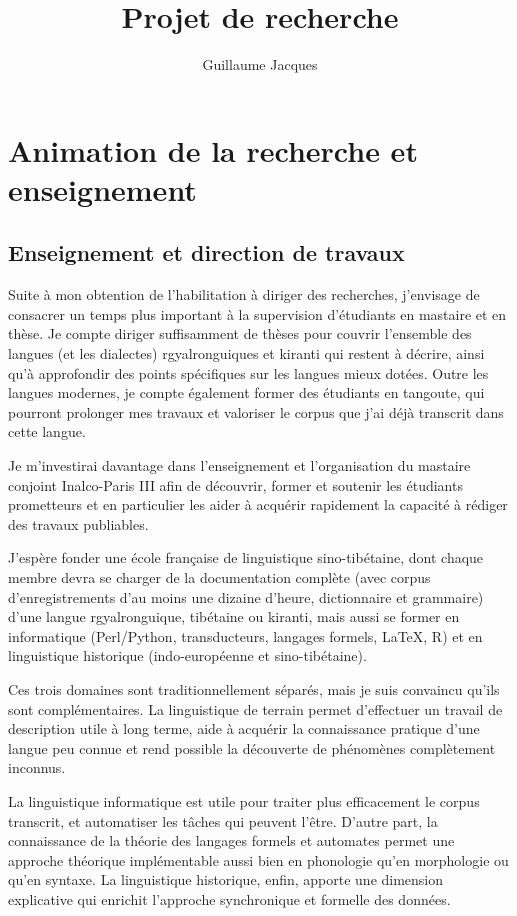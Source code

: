 \documentclass[oldfontcommands,oneside,a4paper,11pt]{article}
\begin{document}
\title{Projet de recherche} 
\author{Guillaume Jacques}
\maketitle

\sloppy
\tableofcontents

\section{Animation de la recherche et enseignement}

\subsection{Enseignement et direction de travaux}
Suite à mon obtention de l'habilitation à diriger des recherches, j'envisage de consacrer un temps plus important à la supervision d'étudiants en mastaire et en thèse. Je compte diriger suffisamment de thèses pour couvrir l'ensemble des langues (et les dialectes) rgyalronguiques et kiranti qui restent à décrire, ainsi qu'à approfondir des points spécifiques sur les langues mieux dotées. Outre les langues modernes, je compte également former des étudiants en tangoute, qui pourront prolonger mes travaux et valoriser le corpus que j'ai déjà transcrit dans cette langue. 
 
Je m'investirai davantage dans l'enseignement et l'organisation du mastaire conjoint Inalco-Paris III afin de découvrir, former et soutenir les étudiants prometteurs et en particulier les aider à acquérir rapidement la capacité à rédiger des travaux publiables.

J'espère  fonder une école française de linguistique sino-tibétaine, dont chaque membre devra se charger de la documentation complète (avec corpus d'enregistrements d'au moins une dizaine d'heure, dictionnaire et grammaire) d'une langue rgyalronguique, tibétaine ou  kiranti, mais aussi se former en informatique (Perl/Python, transducteurs, langages formels, \LaTeX, R)  et en linguistique historique (indo-européenne et sino-tibétaine).

Ces trois domaines sont traditionnellement séparés, mais je suis convaincu qu'ils sont complémentaires. La linguistique de terrain permet d'effectuer un travail de description utile à long terme, aide à acquérir la connaissance pratique d'une langue peu connue et rend possible la découverte de phénomènes complètement inconnus. 

 La linguistique informatique est utile pour traiter plus efficacement le corpus transcrit, et automatiser les tâches qui peuvent l'être. D'autre part, la connaissance de la théorie des langages formels et automates permet une approche théorique implémentable  aussi bien en phonologie qu'en morphologie ou qu'en syntaxe.
La linguistique historique, enfin, apporte une dimension explicative qui enrichit l'approche   synchronique et formelle des données.
\end{document}
